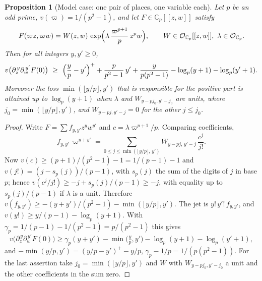 \documentclass[10pt]{amsart}
\newtheorem{proposition}[theorem]{Proposition}
\theoremstyle{definition}
\theoremstyle{remark}
\newcommand{\C}{\mathbb C}
\begin{document}
\begin{proposition}[Model case: one pair of places, one variable each]\label{au:local}
Let $p$ be an odd prime, $v(\varpi)=1/(p^2-1)$, and let $F\in\C_p[[z,w]]$ satisfy
\[
F(\varpi z,\varpi w)=W(z,w)\,\exp\Bigl(\lambda\,\frac{\varpi^{p+1}}p\,z^pw\Bigr),\qquad
W\in\auO_{\C_p}[[z,w]],\ \lambda\in\auO_{\C_p}.
\]
Then for all integers $y,y'\ge0$,
\[
v\bigl(\partial_z^{\,y}\partial_w^{\,y'}F(0)\bigr)\ \ge\ \Bigl(\frac yp-y'\Bigr)^+
+\frac{p}{p^2-1}\,y'+\frac{y}{p(p^2-1)}-\log_p(y+1)-\log_p(y'+1).
\]
Moreover the loss $\min(\lfloor y/p\rfloor,y')$ that is responsible for the positive part is
attained up to $\log_p(y+1)$ when $\lambda$ and $W_{y-pj_0,y'-j_0}$ are units, where
$j_0=\min(\lfloor y/p\rfloor,y')$, and $W_{y-pj,y'-j}=0$ for the other $j\le j_0$.
\end{proposition}
\begin{proof}
Write $F=\sum f_{y,y'}z^yw^{y'}$ and $c=\lambda\varpi^{p+1}/p$. Comparing coefficients,
\[
f_{y,y'}\,\varpi^{y+y'}=\sum_{0\le j\le\min(\lfloor y/p\rfloor,\,y')}W_{y-pj,\,y'-j}\,
\frac{c^j}{j!} .
\]
Now $v(c)\ge(p+1)/(p^2-1)-1=1/(p-1)-1$ and $v(j!)=(j-s_p(j))/(p-1)$, with $s_p(j)$ the sum of the
digits of $j$ in base $p$; hence $v(c^j/j!)\ge-j+s_p(j)/(p-1)\ge-j$, with equality up to
$s_p(j)/(p-1)$ if $\lambda$ is a unit. Therefore $v(f_{y,y'})\ge-(y+y')/(p^2-1)-\min(\lfloor
y/p\rfloor,y')$. The jet is $y!\,y'!\,f_{y,y'}$, and $v(y!)\ge y/(p-1)-\log_p(y+1)$. With
$\gamma_p=1/(p-1)-1/(p^2-1)=p/(p^2-1)$ this gives
\[
v\bigl(\partial_z^{\,y}\partial_w^{\,y'}F(0)\bigr)\ge\gamma_p(y+y')-\min\bigl(\tfrac yp,y'\bigr)
-\log_p(y+1)-\log_p(y'+1),
\]
and $-\min(y/p,y')=(y/p-y')^+-y/p$, $\gamma_p-1/p=1/(p(p^2-1))$. For the last assertion take
$j_0=\min(\lfloor y/p\rfloor,y')$ and $W$ with $W_{y-pj_0,y'-j_0}$ a unit and the other
coefficients in the sum zero.
\end{proof}
\end{document}
